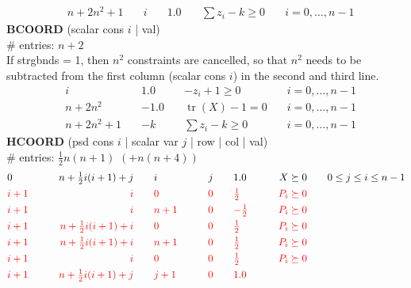 \documentclass[11pt,a4paper]{article}
\DeclareMathOperator{\tr}{tr}
\theoremstyle{definition}
\begin{document}
{\[\begin{aligned}
    & n+2n^2+1 \quad & i \quad & 1.0 \quad & \sum z_i - k \geq 0 \quad &
    i = 0,\dots,n-1
  \end{aligned}
\]
\textbf{BCOORD} (scalar cons $i$ | val) \\
\# entries: $n+2$ \\
{\color{blue} If strgbnds = 1, then $n^2$ constraints are cancelled, so
  that $n^2$ needs to be subtracted from the first column
  (scalar cons $i$) in the second and third line.}
\[
  \begin{aligned}
    & i \quad & 1.0 \quad & -z_i + 1 \geq 0 \quad & i = 0,\dots,n-1 \\
    & n+2n^2 \quad & -1.0 \quad & \tr(X) - 1 = 0 \quad & i = 0,\dots,n-1
    \\
    & n+2n^2+1 \quad & -k  \quad & \sum z_i - k \geq 0 \quad & i =
    0,\dots,n-1
  \end{aligned}
\]
\textbf{HCOORD} (psd cons $i$ | scalar var $j$ | row | col | val) \\
\# entries: $\tfrac{1}{2}n(n+1)$ {\color{red} $(+n(n+4))$} \\
\[
  \begin{aligned}
    &0 \qquad &n+\tfrac{1}{2}i(i+1)+j \qquad &i \qquad &j \qquad &1.0
    \qquad &X \succeq 0 \qquad &0 \leq j \leq i \leq n-1 \\
    &{\color{red}i+1} \qquad &{\color{red}i} \qquad &{\color{red}0} \qquad
    &{\color{red}0} \qquad &{\color{red}\tfrac{1}{2}} \qquad
    &{\color{red}P_i \succeq 0} \qquad & \\
    &{\color{red}i+1} \qquad &{\color{red}i} \qquad &{\color{red}n+1} \qquad
    &{\color{red}0} \qquad &{\color{red}-\tfrac{1}{2}} \qquad
    &{\color{red}P_i \succeq 0} \qquad &\\
    &{\color{red}i+1} \qquad &{\color{red}n+\tfrac{1}{2}i(i+1)+i} \qquad &{\color{red}0} \qquad
    &{\color{red}0} \qquad &{\color{red}\tfrac{1}{2}} \qquad
    &{\color{red}P_i \succeq 0} \qquad &\\
    &{\color{red}i+1} \qquad &{\color{red}n+\tfrac{1}{2}i(i+1)+i} \qquad &{\color{red}n+1} \qquad
    &{\color{red}0} \qquad &{\color{red}\tfrac{1}{2}} \qquad
    &{\color{red}P_i \succeq 0} \qquad &\\
    &{\color{red}i+1} \qquad &{\color{red}i} \qquad &{\color{red}0} \qquad
    &{\color{red}0} \qquad &{\color{red}\tfrac{1}{2}} \qquad
    &{\color{red}P_i \succeq 0} \qquad &\\
    &{\color{red}i+1} \qquad &{\color{red}n+\tfrac{1}{2}i(i+1)+j} \qquad &{\color{red}j+1} \qquad
    &{\color{red}0} \qquad &{\color{red}1.0} \qquad

\end{aligned}\]}
\end{document}
